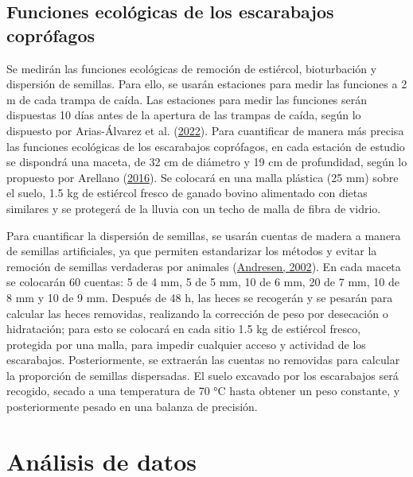 \documentclass[
  11pt,
  a4paper]{book}
\begin{document}
\hypertarget{funciones-ecoluxf3gicas-de-los-escarabajos-copruxf3fagos}{%
\subsection{Funciones ecológicas de los escarabajos coprófagos}\label{funciones-ecoluxf3gicas-de-los-escarabajos-copruxf3fagos}}

Se medirán las funciones ecológicas de remoción de estiércol, bioturbación y dispersión de semillas. Para ello, se usarán estaciones para medir las funciones a 2 m de cada trampa de caída. Las estaciones para medir las funciones serán dispuestas 10 días antes de la apertura de las trampas de caída, según lo dispuesto por Arias-Álvarez et al. (\protect\hyperlink{ref-arias2022efecto}{2022}). Para cuantificar de manera más precisa las funciones ecológicas de los escarabajos coprófagos, en cada estación de estudio se dispondrá una maceta, de 32 cm de diámetro y 19 cm de profundidad, según lo propuesto por Arellano (\protect\hyperlink{ref-arellano2016novel}{2016}). Se colocará en una malla plástica (25 mm) sobre el suelo, 1.5 kg de estiércol fresco de ganado bovino alimentado con dietas similares y se protegerá de la lluvia con un techo de malla de fibra de vidrio.

Para cuantificar la dispersión de semillas, se usarán cuentas de madera a manera de semillas artificiales, ya que permiten estandarizar los métodos y evitar la remoción de semillas verdaderas por animales (\protect\hyperlink{ref-andresen2002dung}{Andresen, 2002}). En cada maceta se colocarán 60 cuentas: 5 de 4 mm, 5 de 5 mm, 10 de 6 mm, 20 de 7 mm, 10 de 8 mm y 10 de 9 mm. Después de 48 h, las heces se recogerán y se pesarán para calcular las heces removidas, realizando la corrección de peso por desecación o hidratación; para esto se colocará en cada sitio 1.5 kg de estiércol fresco, protegida por una malla, para impedir cualquier acceso y actividad de los escarabajos. Posteriormente, se extraerán las cuentas no removidas para calcular la proporción de semillas dispersadas. El suelo excavado por los escarabajos será recogido, secado a una temperatura de 70 °C hasta obtener un peso constante, y posteriormente pesado en una balanza de precisión.

\hypertarget{anuxe1lisis-de-datos}{%
\section{Análisis de datos}\label{anuxe1lisis-de-datos}}
\end{document}
